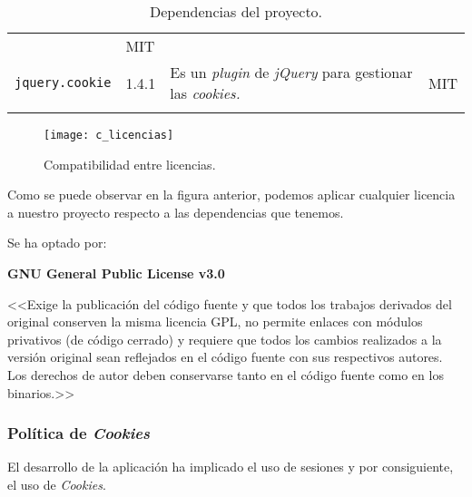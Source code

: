 \begin{longtable}[]{@{}llll@{}}
\begin{minipage}[t]{0.49\columnwidth}
\end{minipage} & \begin{minipage}[t]{0.11\columnwidth}\raggedright\strut
MIT\strut
\end{minipage}\tabularnewline
\begin{minipage}[t]{0.18\columnwidth}\raggedright\strut
\texttt{jquery.cookie}\strut
\end{minipage} & \begin{minipage}[t]{0.08\columnwidth}\raggedright\strut
1.4.1\strut
\end{minipage} & \begin{minipage}[t]{0.49\columnwidth}\raggedright\strut
Es un \emph{plugin} de \emph{jQuery} para gestionar las \emph{cookies.} \strut
\end{minipage} & \begin{minipage}[t]{0.11\columnwidth}\raggedright\strut
MIT\strut
\end{minipage}\tabularnewline
\bottomrule
\caption{Dependencias del proyecto.}
\end{longtable}

\begin{figure}[H]
	\centering
	\texttt{[image: c\_licencias]}
	\caption{Compatibilidad entre licencias\cite{licencias}.}
	\label{fig:c_licencias}
\end{figure}

Como se puede observar en la figura anterior, podemos aplicar cualquier licencia a nuestro proyecto respecto a las dependencias que tenemos.

Se ha optado por: 

\textbf{GNU General Public License v3.0}\

<<Exige la publicación del código fuente y que todos los trabajos derivados del original conserven la misma licencia GPL, no permite enlaces con módulos privativos (de código cerrado) y requiere que todos los cambios realizados a la versión original sean reflejados en el código fuente con sus respectivos autores.
Los derechos de autor deben conservarse tanto en el código fuente como en los binarios.>>\cite{GNU}

\subsubsection{Política de \emph{Cookies}}

El desarrollo de la aplicación ha implicado el uso de sesiones y por consiguiente, el uso de \emph{Cookies}. 

